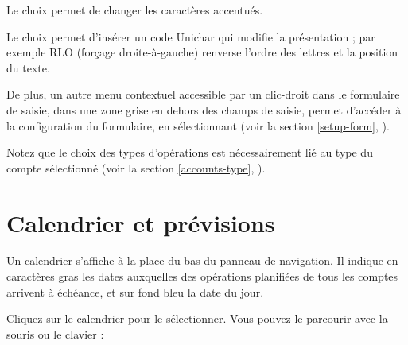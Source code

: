 Le choix  permet de changer les caractères accentués.

Le choix  permet d'insérer un code Unichar qui modifie la présentation ; par exemple RLO (forçage droite-à-gauche) renverse l'ordre des lettres et la position du texte.

De plus, un autre menu contextuel accessible par un clic-droit dans le formulaire de saisie, dans une zone grise en dehors des champs de saisie, permet d'accéder à la configuration du formulaire, en sélectionnant   (voir la section \vref{setup-form}, ).

Notez que le choix des types d'opérations est nécessairement lié au type du compte sélectionné (voir la section \vref{accounts-type}, ).


\section{Calendrier et prévisions\label{plannedtransactions-calendar}}


Un calendrier s'affiche à la place du bas du panneau de navigation. Il indique en caractères gras les dates auxquelles des opérations planifiées de tous les comptes arrivent à échéance, et sur fond bleu{\couleur} la date du jour.

Cliquez sur le calendrier pour le sélectionner. Vous pouvez le parcourir avec la souris ou le clavier :

